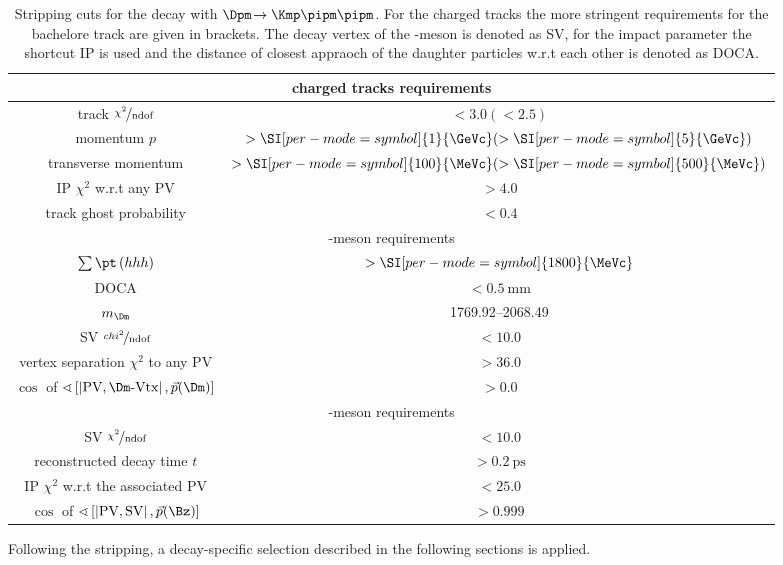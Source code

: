 \begin{table}[tbp]
	\centering
	\caption{Stripping cuts for the decay \BdToDpi with $\Dpm\!\to\Kmp\pipm\pipm$.
	For the charged tracks the more stringent requirements for the bachelore track are given in brackets.
	The decay vertex of the \Bz-meson is denoted as \ac{SV}, for the impact parameter the shortcut IP is used and the distance of closest appraoch of the \Dm daughter particles w.r.t each other is denoted as DOCA.}
	\begin{tabular}{cc}
		\toprule
		\multicolumn{2}{c}{charged tracks requirements}\\
		\midrule
		track $\nicefrac{\chi^2}{\text{ndof}}$		& $<3.0 (<2.5)$ \\
		momentum $p$ 								& $>\SI[per-mode=symbol]{1}{\GeVc} (>\SI[per-mode=symbol]{5}{\GeVc})$ \\
		transverse momentum \pt 					& $>\SI[per-mode=symbol]{100}{\MeVc} (>\SI[per-mode=symbol]{500}{\MeVc})$ \\
		IP $\chi^2$ w.r.t any \ac{PV}	& $>4.0$ \\
		track ghost probability 					& $<0.4$ \\
		\midrule
		\multicolumn{2}{c}{\Dm-meson requirements}\\
		\midrule
		$\sum \pt\left(hhh\right)$ 																				& $>\SI[per-mode=symbol]{1800}{\MeVc}$ \\
		DOCA 																									& $<\SI{0.5}{\milli\metre}$ \\
		$m_\Dm$ 																								& \SIrange[per-mode=symbol]{1769.92}{2068.49}{\MeVcc} \\
		\ac{SV} $\nicefrac{chi^2}{\text{ndof}}$ 														& $<10.0$ \\
		vertex separation $\chi^2$ to any \ac{PV} 																& $>36.0$ \\
		$\cos$ of $\sphericalangle\left[\left|\text{PV},\Dm\text{-Vtx}\right|, \vec{p}\!\left(\Dm\right)\right]$	& $>0.0$ \\
		\midrule
		\multicolumn{2}{c}{\Bz-meson requirements}\\
		\midrule
		\ac{SV} $\nicefrac{\chi^2}{\text{ndof}}$ 																& $<10.0$ \\
		reconstructed decay time $t$ 																		& $>\SI{0.2}{\pico\second}$ \\
		IP $\chi^2$ w.r.t the associated \ac{PV} 												& $<25.0$ \\
		$\cos$ of $\sphericalangle\left[\left|\text{PV},\text{SV}\right|, \vec{p}\!\left(\Bz\right)\right]$	& $>0.999$ \\
		\bottomrule
	\end{tabular}
	\label{tab:stripping}
\end{table}
Following the stripping, a decay-specific selection described in the following sections is applied.


